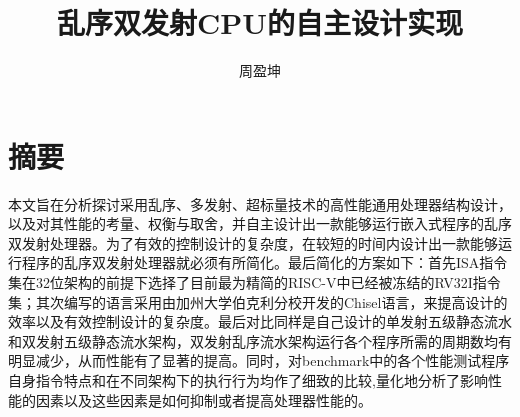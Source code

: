 \confidential{}%
\title{乱序双发射CPU的自主设计实现}%
\author{周盈坤}%
\advisorsec{}%
\maketitle%
\makeenglishtitle%
\makedeclaration%
\chapter*{摘\quad 要}%
\setcounter{page}{1}%
本文旨在分析探讨采用乱序、多发射、超标量技术的高性能通用处理器结构设计，以及对其性能的考量、权衡与取舍，并自主设计出一款能够运行嵌入式程序的乱序双发射处理器。为了有效的控制设计的复杂度，在较短的时间内设计出一款能够运行程序的乱序双发射处理器就必须有所简化。最后简化的方案如下：首先ISA指令集在32位架构的前提下选择了目前最为精简的RISC-V中已经被冻结的RV32I指令集；其次编写的语言采用由加州大学伯克利分校开发的Chisel语言，来提高设计的效率以及有效控制设计的复杂度。最后对比同样是自己设计的单发射五级静态流水和双发射五级静态流水架构，双发射乱序流水架构运行各个程序所需的周期数均有明显减少，从而性能有了显著的提高。同时，对benchmark中的各个性能测试程序自身指令特点和在不同架构下的执行行为均作了细致的比较,量化地分析了影响性能的因素以及这些因素是如何抑制或者提高处理器性能的。

